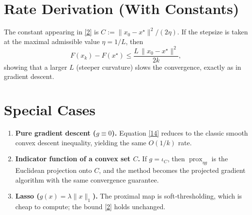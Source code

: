 \documentclass{article}
\newcommand{\prox}{\operatorname{prox}}
\begin{document}
\section*{Rate Derivation (With Constants)}
The constant appearing in \eqref{2} is $C:=\|x_{0}-x^{\star}\|^{2}/(2\eta)$.  
If the stepsize is taken at the maximal admissible value $\eta=1/L$, then
\[
F(x_{k})-F(x^{\star})\le \frac{L\,\|x_{0}-x^{\star}\|^{2}}{2k},
\]
showing that a larger $L$ (steeper curvature) slows the convergence, exactly as in gradient descent.

\section*{Special Cases}
\begin{enumerate}[label=\arabic*.]
\item \textbf{Pure gradient descent ($g\equiv0$).}  
Equation \eqref{14} reduces to the classic smooth convex descent inequality, yielding the same $O(1/k)$ rate.
\item \textbf{Indicator function of a convex set $C$.}  
If $g=\iota_{C}$, then $\prox_{\eta g}$ is the Euclidean projection onto $C$, and the method becomes the projected gradient algorithm with the same convergence guarantee.
\item \textbf{Lasso ($g(x)=\lambda\|x\|_{1}$).}  
The proximal map is soft‑thresholding, which is cheap to compute; the bound \eqref{2} holds unchanged.
\end{enumerate}
\end{document}
